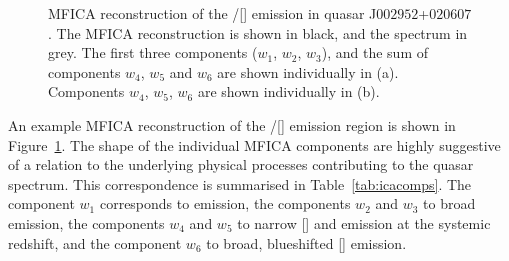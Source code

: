 \begin{figure}[t!]
   \captionsetup[subfigure]{labelformat=empty}
    \centering
    \subfloat[\label{fig:mfica_components_a}]{}
    \subfloat[\label{fig:mfica_components_b}]{}
    \caption[{MFICA reconstruction of the \hbns/[] emission in quasar J$002952$+$020607$.}]{MFICA reconstruction of the \hbns/[] emission in quasar J$002952$+$020607$. The MFICA reconstruction is shown in black, and the spectrum in grey. The first three components ($w_1$, $w_2$, $w_3$), and the sum of components $w_4$, $w_5$ and $w_6$ are shown individually in (a). Components $w_4$, $w_5$, $w_6$ are shown individually in (b).}     
    \label{fig:mfica_components}
\end{figure}

An example MFICA reconstruction of the \hbns/[] emission region is shown in Figure~\ref{fig:mfica_components}. 
The shape of the individual MFICA components are highly suggestive of a relation to the underlying physical processes contributing to the quasar spectrum.  
This correspondence is summarised in Table~\ref{tab:icacomps}. 
The component $w_1$ corresponds to  emission, the components $w_2$ and $w_3$ to broad \hb emission, the components $w_4$ and $w_5$ to narrow [] and \hb emission at the systemic redshift, and the component $w_6$ to broad, blueshifted [] emission. 

